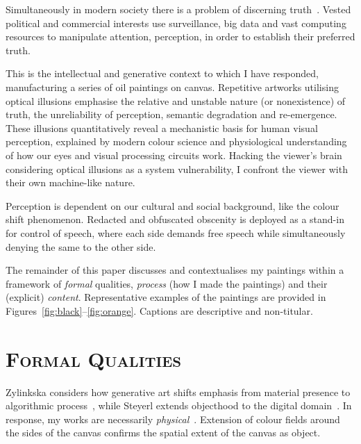 \documentclass[12pt]{article}
\begin{document}
Simultaneously in modern society there is a problem of discerning
truth~\cite{keyes2004posttruth,mcintyre2018posttruth}.  Vested
political and commercial interests use surveillance, big data and vast
computing resources to manipulate attention, perception, in order to
establish their preferred truth.

This is the intellectual and generative context to which I have
responded, manufacturing a series of oil paintings on
canvas. Repetitive artworks utilising optical illusions emphasise the
relative and unstable nature (or nonexistence) of truth, the
unreliability of perception, semantic degradation and
re-emergence. These illusions quantitatively reveal a mechanistic
basis for human visual perception, explained by modern colour science
and physiological understanding of how our eyes and visual processing
circuits work. Hacking the viewer's brain considering optical
illusions as a system vulnerability, I confront the viewer with their
own machine-like nature.

Perception is dependent on our cultural and social background, like
the colour shift phenomenon.  Redacted and obfuscated obscenity is
deployed as a stand-in for control of speech, where each side demands
free speech while simultaneously denying the same to the other side.

The remainder of this paper discusses and contextualises my paintings
within a framework of \emph{formal} qualities, \emph{process} (how I
made the paintings) and their (explicit)
\emph{content}. Representative examples of the paintings are provided
in Figures~\ref{fig:black}--\ref{fig:orange}. Captions are descriptive
and non-titular.

\section{\textsc{Formal Qualities}}
Zylinkska considers how generative art shifts emphasis from material
presence to algorithmic process~\cite{zylinska2020ai}, while Steyerl
extends objecthood to the digital domain~\cite{steyerl2017duty}. In
response, my works are necessarily
\emph{physical}~\cite{fontana1947spatial,merleauponty1964eye}. Extension
of colour fields around the sides of the canvas confirms the spatial
extent of the canvas as object.
\end{document}
